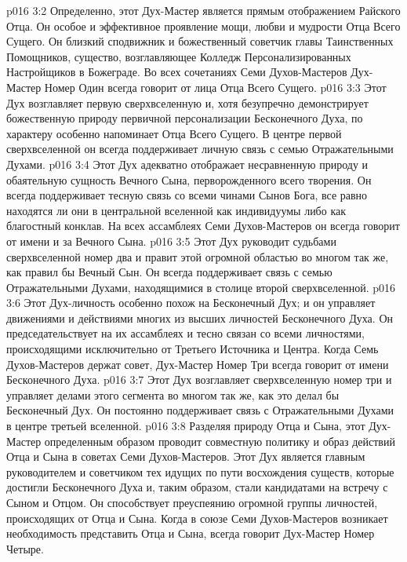 \vs p016 3:2  Определенно, этот Дух\hyp{}Мастер является прямым отображением Райского Отца. Он особое и эффективное проявление мощи, любви и мудрости Отца Всего Сущего. Он близкий сподвижник и божественный советчик главы Таинственных Помощников, существо, возглавляющее Колледж Персонализированных Настройщиков в Божеграде. Во всех сочетаниях Семи Духов\hyp{}Мастеров Дух\hyp{}Мастер Номер Один всегда говорит от лица Отца Всего Сущего.
\vs p016 3:3 Этот Дух возглавляет первую сверхвселенную и, хотя безупречно демонстрирует божественную природу первичной персонализации Бесконечного Духа, по характеру особенно напоминает Отца Всего Сущего. В центре первой сверхвселенной он всегда поддерживает личную связь с семью Отражательными Духами.
\vs p016 3:4 \pc {} Этот Дух адекватно отображает несравненную природу и обаятельную сущность Вечного Сына, перворожденного всего творения. Он всегда поддерживает тесную связь со всеми чинами Сынов Бога, все равно находятся ли они в центральной вселенной как индивидуумы либо как благостный конклав. На всех ассамблеях Семи Духов\hyp{}Мастеров он всегда говорит от имени и за Вечного Сына.
\vs p016 3:5 Этот Дух руководит судьбами сверхвселенной номер два и правит этой огромной областью во многом так же, как правил бы Вечный Сын. Он всегда поддерживает связь с семью Отражательными Духами, находящимися в столице второй сверхвселенной.
\vs p016 3:6 \pc {} Этот Дух\hyp{}личность особенно похож на Бесконечный Дух; и он управляет движениями и действиями многих из высших личностей Бесконечного Духа. Он председательствует на их ассамблеях и тесно связан со всеми личностями, происходящими исключительно от Третьего Источника и Центра. Когда Семь Духов\hyp{}Мастеров держат совет, Дух\hyp{}Мастер Номер Три всегда говорит от имени Бесконечного Духа.
\vs p016 3:7 Этот Дух возглавляет сверхвселенную номер три и управляет делами этого сегмента во многом так же, как это делал бы Бесконечный Дух. Он постоянно поддерживает связь с Отражательными Духами в центре третьей вселенной.
\vs p016 3:8 \pc {} Разделяя природу Отца и Сына, этот Дух\hyp{}Мастер определенным образом проводит совместную политику и образ действий Отца и Сына в советах Семи Духов\hyp{}Мастеров. Этот Дух является главным руководителем и советчиком тех идущих по пути восхождения существ, которые достигли Бесконечного Духа и, таким образом, стали кандидатами на встречу с Сыном и Отцом. Он способствует преуспеянию огромной группы личностей, происходящих от Отца и Сына. Когда в союзе Семи Духов\hyp{}Мастеров возникает необходимость представить Отца и Сына, всегда говорит Дух\hyp{}Мастер Номер Четыре.
